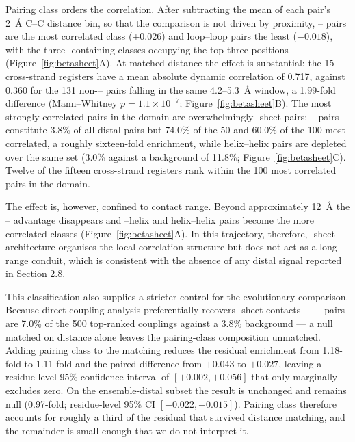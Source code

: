 \documentclass[utf8]{FrontiersinHarvard}
\begin{document}
Pairing class orders the correlation. After subtracting the mean of each pair's 2~\AA{} C\textalpha{}--C\textalpha{} distance bin, so that the comparison is not driven by proximity, \textbeta{}--\textbeta{} pairs are the most correlated class ($+0.026$) and loop--loop pairs the least ($-0.018$), with the three \textbeta{}-containing classes occupying the top three positions (Figure~\ref{fig:betasheet}A). At matched distance the effect is substantial: the 15 cross-strand registers have a mean absolute dynamic correlation of 0.717, against 0.360 for the 131 non-\textbeta{}--\textbeta{} pairs falling in the same 4.2--5.3~\AA{} window, a 1.99-fold difference (Mann--Whitney $p = 1.1 \times 10^{-7}$; Figure~\ref{fig:betasheet}B). The most strongly correlated pairs in the domain are overwhelmingly \textbeta{}-sheet pairs: \textbeta{}--\textbeta{} pairs constitute 3.8\% of all distal pairs but 74.0\% of the 50 and 60.0\% of the 100 most correlated, a roughly sixteen-fold enrichment, while helix--helix pairs are depleted over the same set (3.0\% against a background of 11.8\%; Figure~\ref{fig:betasheet}C). Twelve of the fifteen cross-strand registers rank within the 100 most correlated pairs in the domain.

The effect is, however, confined to contact range. Beyond approximately 12~\AA{} the \textbeta{}--\textbeta{} advantage disappears and \textbeta{}--helix and helix--helix pairs become the more correlated classes (Figure~\ref{fig:betasheet}A). In this trajectory, therefore, \textbeta{}-sheet architecture organises the local correlation structure but does not act as a long-range conduit, which is consistent with the absence of any distal signal reported in Section 2.8.

This classification also supplies a stricter control for the evolutionary comparison. Because direct coupling analysis preferentially recovers \textbeta{}-sheet contacts --- \textbeta{}--\textbeta{} pairs are 7.0\% of the 500 top-ranked couplings against a 3.8\% background --- a null matched on distance alone leaves the pairing-class composition unmatched. Adding pairing class to the matching reduces the residual enrichment from 1.18-fold to 1.11-fold and the paired difference from $+0.043$ to $+0.027$, leaving a residue-level 95\% confidence interval of $[+0.002, +0.056]$ that only marginally excludes zero. On the ensemble-distal subset the result is unchanged and remains null (0.97-fold; residue-level 95\% CI $[-0.022, +0.015]$). Pairing class therefore accounts for roughly a third of the residual that survived distance matching, and the remainder is small enough that we do not interpret it.
\end{document}
